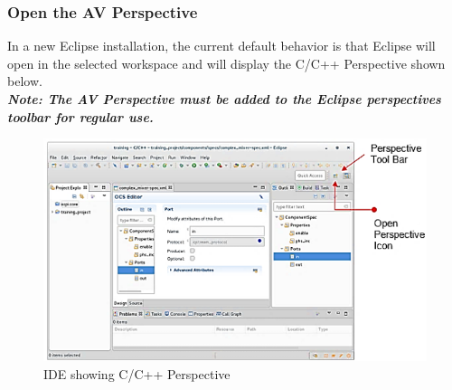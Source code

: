 \documentclass[10pt, a4paper, oneside]{article}
\begin{document}
\subsubsection{Open the AV Perspective}
 In a new Eclipse installation, the current default behavior is that Eclipse will open in the selected workspace and will display the C/C++ Perspective shown below.\\

\textbf{\emph{Note: The AV Perspective must be added to the Eclipse perspectives toolbar for regular use.}}
\begin{figure}[h!]
\centering
\caption{IDE showing C/C++ Perspective}\label{fig:IDE_CandC++Perspective}
	\includegraphics[width=1.0\textwidth]{CandC++.png}
\end{figure}
\end{document}
